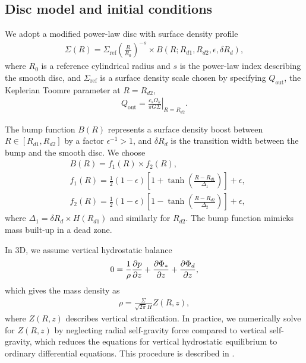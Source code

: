 \subsection{Disc model and initial conditions}
We adopt a modified power-law disc with surface
density profile 
\begin{align}
  \Sigma(R) = \Sigma_\mathrm{ref} \left(\frac{R}{R_0}\right)^{-s}\times B(R;
  R_{d1}, R_{d2}, \epsilon, \delta R_d), 
\end{align}
where $R_0$ is a reference cylindrical radius and $s$ is the power-law
index describing the smooth disc, and $\Sigma_\mathrm{ref}$ is a
surface density scale chosen by specifying $Q_\mathrm{out}$,
the Keplerian Toomre parameter at $R=R_{d2}$,
\begin{align}
  Q_\mathrm{out} = \left.\frac{c_s\Omega_k}{\pi G
    \Sigma}\right|_{R=R_{d2}}. 
\end{align}

The bump function
$B(R)$ represents a surface density boost between
$R\in[R_{d1},R_{d2}]$ by a factor $\epsilon^{-1}>1$,
and $\delta R_d$ is the transition width between the bump and the
smooth disc. We choose 
\begin{align}
  &B(R) = f_1(R)\times f_2(R),\\
  &f_1(R) = \frac{1}{2}\left(1 - \epsilon\right)\left[1 +
    \tanh\left(\frac{R-R_{d1}}{\Delta_1}\right)\right]  + \epsilon,\\
  &f_2(R) = \frac{1}{2}\left(1 - \epsilon\right)\left[1 -
    \tanh\left(\frac{R-R_{d2}}{\Delta_2}\right)\right]  + \epsilon,
\end{align}
where $\Delta_1 = \delta R_d \times H(R_{d1})$ and similarly for
$R_{d2}$. The bump function mimicks mass built-up in a dead zone.


In 3D, we assume vertical hydrostatic balance
\begin{align}
  0 = \frac{1}{\rho}\frac{\partial p}{\partial z} + \frac{\partial\Phi_*}{\partial z} + \frac{\partial
    \Phi_d}{\partial z},  
\end{align}
which gives the mass density as 
\begin{align}
  \rho = \frac{\Sigma}{\sqrt{2\pi}H}Z(R,z),
\end{align}
where $Z(R,z)$ describes vertical stratification. In practice, we
numerically solve for $Z(R,z)$ by neglecting radial self-gravity
force compared to vertical self-gravity, which reduces the equations
for vertical hydrostatic equilibrium to ordinary differential
equations.  This procedure is described in \cite{lin12b}. 

